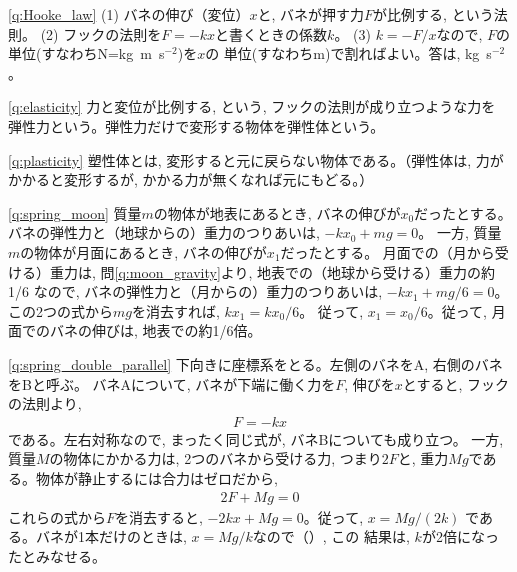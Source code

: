 %
\ref{q:Hooke_law} 
(1) バネの伸び（変位）$x$と, バネが押す力$F$が比例する, という法則。
(2) フックの法則を$F=-kx$と書くときの係数$k$。
(3) $k=-F/x$なので, $F$の単位(すなわちN=kg~m~s$^{-2}$)を$x$の
単位(すなわちm)で割ればよい。答は, kg~s$^{-2}$。
\mv

\ref{q:elasticity} 
力と変位が比例する, という, フックの法則が成り立つような力を
弾性力という。弾性力だけで変形する物体を弾性体という。
\vspace{0.2cm}

\ref{q:plasticity} 
塑性体とは, 変形すると元に戻らない物体である。（弾性体は, 
力がかかると変形するが, かかる力が無くなれば元にもどる。）
\vspace{0.2cm}

\ref{q:spring_moon} 
質量$m$の物体が地表にあるとき, バネの伸びが$x_0$だったとする。
バネの弾性力と（地球からの）重力のつりあいは, 
$-kx_0+mg=0$。
一方, 質量$m$の物体が月面にあるとき, バネの伸びが$x_1$だったとする。
月面での（月から受ける）重力は, 問\ref{q:moon_gravity}より, 地表での（地球から受ける）重力の約1/6
なので, バネの弾性力と（月からの）重力のつりあいは, 
$-kx_1+mg/6=0$。
この2つの式から$mg$を消去すれば, 
$kx_1=kx_0/6$。
従って, $x_1=x_0/6$。従って, 月面でのバネの伸びは, 地表での約1/6倍。
\vspace{0.2cm}

\ref{q:spring_double_parallel} 
下向きに座標系をとる。左側のバネをA, 右側のバネをBと呼ぶ。
バネAについて, バネが下端に働く力を$F$, 伸びを$x$とすると, フックの法則より, 
\begin{eqnarray}F=-kx\end{eqnarray}
である。左右対称なので, まったく同じ式が, バネBについても成り立つ。
一方, 質量$M$の物体にかかる力は, 2つのバネから受ける力, つまり$2F$と, 
重力$Mg$である。物体が静止するには合力はゼロだから, 
\begin{eqnarray}2F+Mg=0\end{eqnarray}
これらの式から$F$を消去すると, $-2kx+Mg=0$。従って, 
$x=Mg/(2k)$
である。バネが1本だけのときは, $x=Mg/k$なので（）, この
結果は, $k$が2倍になったとみなせる。
\vspace{0.2cm}

